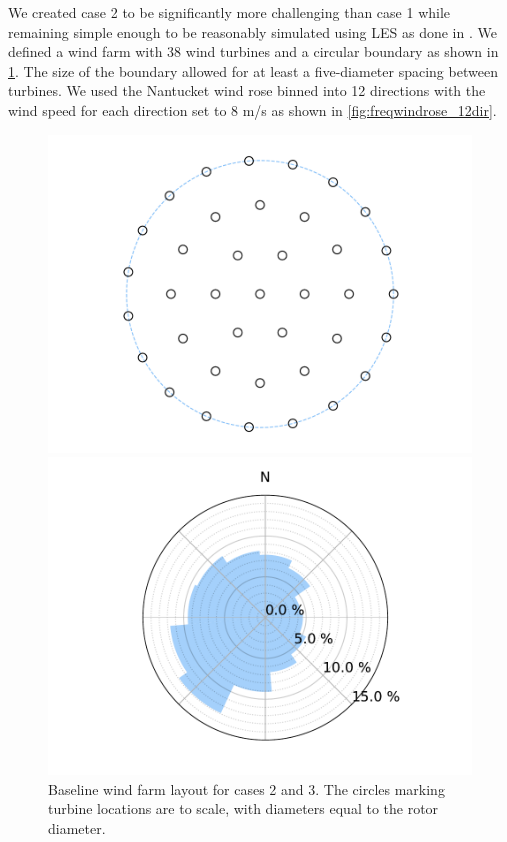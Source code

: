 \documentclass[journal abbreviation, manuscript]{copernicus}
\begin{document}
	We created case 2 to be significantly more challenging than case 1 while remaining simple enough to be reasonably simulated using LES as done in \cite{thomas2019-les-validation}. We defined a wind farm with 38 wind turbines and a circular boundary as shown in \ref{fig:layout2and3}. The size of the boundary allowed for at least a five-diameter spacing between turbines. We used the Nantucket wind rose binned into 12 directions with the wind speed for each direction set to 8 m/s as shown in \ref{fig:freqwindrose_12dir}.
	\begin{figure}[h!]
		\centering
		\begin{minipage}[t]{18pc}
			\centering
			\includegraphics[width=\textwidth, trim={1.5cm, 0cm, 1.5cm, 0cm}, clip]{final_images/layouts/38_turb_start.pdf}
			\caption{Baseline wind farm layout for cases 2 and 3. The circles marking turbine locations are to scale, with diameters equal to the rotor diameter.}
			\label{fig:layout2and3}
		\end{minipage} \hspace{1pc}
		\begin{minipage}[t]{18pc}
			\centering
			\includegraphics[width=\textwidth, trim={1.5cm 0cm 1.5cm 0cm}, clip]{final_images/windroses/freqwindrose_12_dir.pdf}

\end{minipage}
\end{figure}
\end{document}
